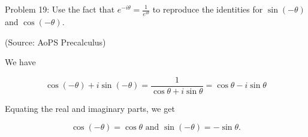 Problem 19: Use the fact that $\displaystyle e^{-i\theta} = \frac{1}{e^{i\theta}}$ to reproduce the identities for $\sin(-\theta)$ and $\cos(-\theta)$.

(Source: AoPS Precalculus)

We have

$$ \cos(-\theta) + i\sin(-\theta) = \frac{1}{\cos \theta + i \sin \theta} = \cos \theta - i \sin \theta $$

Equating the real and imaginary parts, we get

$$ \boxed{\cos(-\theta) = \cos \theta} \text{ and } \boxed{\sin(-\theta) = -\sin \theta}. $$
